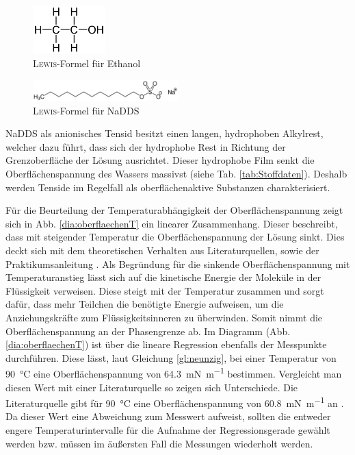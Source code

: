 \begin{figure}[h!]
	\centering
	\includegraphics[width=0.25\textwidth]{img/ethanol}
	\caption{\textsc{Lewis}-Formel für Ethanol \cite{Wikipedia.2020d}}
	\label{fig:ethanol}
\end{figure}
\FloatBarrier
\begin{figure}[h!]
	\centering
	\includegraphics[width=0.5\textwidth]{img/nadds}
	\caption{\textsc{Lewis}-Formel für NaDDS \cite{Wikipedia.2020c}}
	\label{fig:nadds}
\end{figure}
\FloatBarrier
NaDDS als anionisches Tensid besitzt einen langen, hydrophoben Alkylrest, welcher dazu führt, dass sich der hydrophobe Rest in Richtung der Grenzoberfläche der Lösung ausrichtet. Dieser hydrophobe Film senkt die Oberflächenspannung des Wassers massivst (siehe Tab. \ref{tab:Stoffdaten}). Deshalb werden Tenside im Regelfall als oberflächenaktive Substanzen charakterisiert.

Für die Beurteilung der Temperaturabhängigkeit der Oberflächenspannung zeigt sich in Abb. \ref{dia:oberflaechenT} ein linearer Zusammenhang. Dieser beschreibt, dass mit steigender Temperatur die Oberflächenspannung der Lösung sinkt. Dies deckt sich mit dem theoretischen Verhalten aus Literaturquellen, sowie der Praktikumsanleitung \cite{Hulsenberg.2010}.
Als Begründung für die sinkende Oberflächenspannung mit Temperaturanstieg lässt sich auf die kinetische Energie der Moleküle in der Flüssigkeit verweisen. Diese steigt mit der Temperatur zusammen und sorgt dafür, dass mehr Teilchen die benötigte Energie aufweisen, um die Anziehungskräfte zum Flüssigkeitsinneren zu überwinden. Somit nimmt die Oberflächenspannung an der Phasengrenze ab.\linebreak
Im Diagramm (Abb. \ref{dia:oberflaechenT}) ist über die lineare Regression ebenfalls der Messpunkte durchführen. Diese lässt, laut Gleichung \eqref{gl:neunzig}, bei einer Temperatur von \SI{90}{\celsius} eine Oberflächenspannung von \SI{64,3}{\milli \newton \per \meter} bestimmen. Vergleicht man diesen Wert mit einer Literaturquelle so zeigen sich Unterschiede. Die Literaturquelle gibt für \SI{90}{\celsius} eine Oberflächenspannung von \SI{60,8}{\milli \newton \per \meter} an \cite{.20200623T05:06:09.000Z}. Da dieser Wert eine Abweichung zum Messwert aufweist, sollten die entweder engere Temperaturintervalle für die Aufnahme der Regressionsgerade gewählt werden bzw. müssen im äußersten Fall die Messungen wiederholt werden. 








